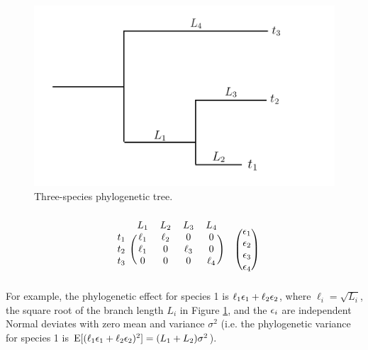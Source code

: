 \documentclass[12pt]{article}
\begin{document}
\begin{center}
\begin{figure}[H]
  \includegraphics[scale=0.8,page=1]{./figure/phylotree.png}
  \caption{Three-species phylogenetic tree.}
\label{fig:tree}
\end{figure}
\end{center}
\[
  \begin{blockarray}{ccccc}
  & L_1 & L_2 & L_3 & L_4  \\
  \begin{block}{c(cccc)}
  t_1 & \ell_1 & \ell_2 & 0           & 0 \\
  t_2 & \ell_1 &  0          & \ell_3 & 0 \\
  t_3 & 0           &  0          & 0           & \ell_4 \\
  \end{block}
  \end{blockarray}
  \hspace{0.5cm}
  \begin{blockarray}{c}
    \vphantom{L_1} \\
    \begin{block}{(c)}
      \e_1 \\
      \e_2 \\
      \e_3 \\
      \e_4 \\
    \end{block}
  \end{blockarray}
  \]
For example, the phylogenetic effect for species 1 is $\ell_1 { \epsilon}_1 + \ell_2 { \epsilon}_2$, where $\ell_i = \sqrt{L_i}$, the square root of the branch length $L_i$ in Figure \ref{fig:tree}, and the ${ \epsilon}_i$ are independent Normal deviates with zero mean and variance $\sigma^2$ (i.e. the phylogenetic variance for species 1 is $\textrm{E}[(\ell_1 { \epsilon}_1 + \ell_2 { \epsilon}_2)^2] = (L_1 + L_2)\sigma^2$).
\end{document}
